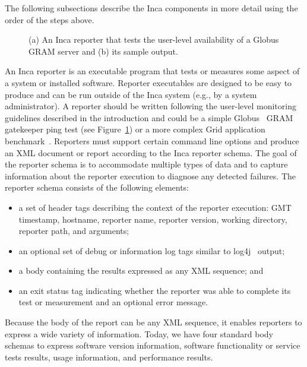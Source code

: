 \documentclass[times,10pt,twocolumn]{article}
\begin{document}
\noindent The following subsections describe the Inca components in more
detail using the order of the steps above.


\lstset{
  basicstyle=\scriptsize\ttfamily, 
  frame=single,
  keywordstyle=\textbf, 
  identifierstyle=, 
  commentstyle=\scriptsize\ttfamily, 
  stringstyle=\ttfamily, 
  numbers=left, 
  numberstyle=\scriptsize,
  stepnumber=2,
  firstnumber=1,
  showstringspaces=false} 
\begin{figure}
\lstset{language=Perl} 
\subfigure[]{}
\subfigure[]{}
\caption{\label{pingReporter}(a) An Inca reporter that tests the user-level
availability of a Globus GRAM server and (b) its sample output.}
\end{figure}

An Inca reporter is an executable program that tests or measures some aspect
of a system or installed software.   Reporter executables are designed to be
easy to produce and can be run outside of the Inca system (e.g., by a system
administrator).  A reporter should be written following the user-level
monitoring guidelines described in the introduction and could be a simple
Globus~\cite{globus} GRAM gatekeeper ping test (see Figure~\ref{pingReporter})
or a more complex Grid application benchmark~\cite{grasp}.  Reporters must
support certain command line options and produce an XML document or report
according to the Inca reporter schema.  The goal of the reporter schema is to
accommodate multiple types of data and to capture information about the
reporter execution to diagnose any detected failures.  The reporter schema
consists of the following elements: 

\begin{itemize}
\item a set of header tags describing the context of the reporter
execution:  GMT timestamp, hostname, reporter name, reporter version, working
directory, reporter path, and arguments;
\item an optional set of debug or information log tags similar to log4j~\cite{log4j} output;
\item a body containing the results expressed as any XML sequence; and
\item an exit status tag
indicating whether the reporter was able to complete its test or measurement
and an optional error message.  
\end{itemize} 
\noindent Because the body of the report can be any XML sequence, it enables
reporters to express a wide variety of information.  Today, we have four
standard body schemas to express software version information, software
functionality or service tests results, usage information, and performance
results.  
\end{document}
